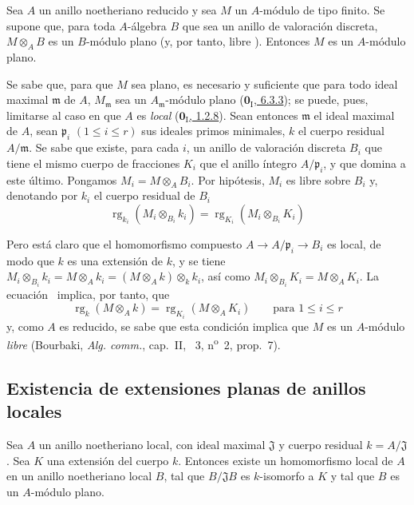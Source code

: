 \begin{proposition}[10.2.8]
\label{0.10.2.8}
\label{0.10.2.8-fr}
Sea $A$ un anillo noetheriano reducido y sea $M$ un $A$-módulo de tipo finito.
Se supone que, para toda $A$-álgebra $B$ que sea un anillo de valoración discreta, $M\otimes_A B$ es un $B$-módulo plano (y, por tanto, libre ).
Entonces $M$ es un $A$-módulo plano.
\end{proposition}


Se sabe que, para que $M$ sea plano, es necesario y suficiente que para todo ideal maximal $\mathfrak m$ de $A$, $M_{\mathfrak m}$ sea un $A_{\mathfrak m}$-módulo plano (\hyperref[0.6.3.3-fr]{$\mathbf{0}_{\mathrm I}$, 6.3.3}); se puede, pues, limitarse al caso en que $A$ es \emph{local} (\hyperref[0.1.2.8-fr]{$\mathbf{0}_{\mathrm I}$, 1.2.8}). Sean entonces $\mathfrak m$ el ideal maximal de $A$, sean $\mathfrak p_i$
$(1\leq i\leq r)$ sus ideales primos minimales, $k$ el cuerpo residual $A/\mathfrak m$.
Se sabe  que existe, para cada $i$, un anillo de valoración discreta $B_i$ que tiene el mismo cuerpo de fracciones $K_i$ que el anillo íntegro $A/\mathfrak p_i$, y que domina a este último. Pongamos $M_i=M\otimes_A B_i$.
Por hipótesis, $M_i$ es libre sobre $B_i$ y, denotando por $k_i$ el cuerpo residual de $B_i$
\[
\label{0.10.2.8.1-fr}
  \operatorname{rg}_{k_i}(M_i\otimes_{B_i}k_i)
  =\operatorname{rg}_{K_i}(M_i\otimes_{B_i}K_i)
  \tag{10.2.8.1}
\]

Pero está claro que el homomorfismo compuesto $A\to A/\mathfrak p_i\to B_i$ es local, de modo que $k$ es una extensión de $k$,
y se tiene
$M_i\otimes_{B_i}k_i=M\otimes_A k_i=(M\otimes_A k)\otimes_k k_i$, así como $M_i\otimes_{B_i}K_i=M\otimes_A K_i$.
La ecuación~ implica, por tanto, que
\[
  \operatorname{rg}_k(M\otimes_A k)=\operatorname{rg}_{K_i}(M\otimes_A K_i)
  \qquad\text{para }1\leq i\leq r
\]
y, como $A$ es reducido, se sabe que esta condición implica que $M$ es un $A$-módulo \emph{libre} (Bourbaki, \emph{Alg. comm.}, cap.~II, \textsection~3, n\textsuperscript{o}~2, prop.~7).


\subsection{Existencia de extensiones planas de anillos locales}
\label{subsection:0.10.3}
\label{subsection:0.10.3-fr}

\begin{proposition}[10.3.1]
\label{0.10.3.1}
\label{0.10.3.1-fr}
Sea $A$ un anillo noetheriano local, con ideal maximal $\mathfrak J$ y cuerpo residual $k=A/\mathfrak J$.
Sea $K$ una extensión del cuerpo $k$.
Entonces existe un homomorfismo local de $A$ en un anillo noetheriano local $B$, tal que $B/\mathfrak J B$ es $k$-isomorfo a $K$ y tal que $B$ es un $A$-módulo plano.
\end{proposition}

